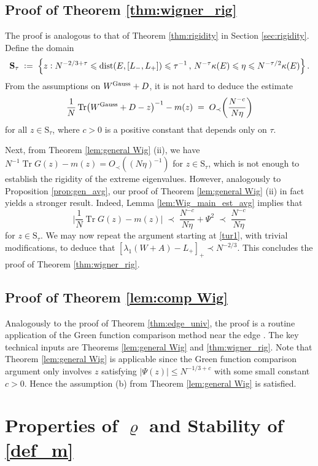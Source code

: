 \documentclass[11pt]{article} %
\numberwithin{equation}{section}
\numberwithin{figure}{section}
\theoremstyle{plain} %
\theoremstyle{definition} %
\newcommand{\f}[1]{\boldsymbol{\mathrm{#1}}} %
\newcommand{\txt}[1]{\text{\rm{#1}}}
\newcommand{\col}{\mathrel{\vcenter{\baselineskip0.75ex \lineskiplimit0pt \hbox{.}\hbox{.}}}}
\newcommand*{\deq}{\mathrel{\vcenter{\baselineskip0.65ex \lineskiplimit0pt \hbox{.}\hbox{.}}}=}
\renewcommand{\leq}{\leqslant}
\newcommand{\pb}[1]{\bigl({#1}\bigr)}
\newcommand{\pbb}[1]{\biggl({#1}\biggr)}
\newcommand{\hB}[1]{\Bigl\{{#1}\Bigr\}}
\newcommand{\abs}[1]{\lvert #1 \rvert}
\newcommand{\absbb}[1]{\biggl\lvert #1 \biggr\rvert}
\DeclareMathOperator{\tr}{Tr}
\DeclareMathOperator{\dist}{dist}
\begin{document}
\subsection{Proof of Theorem \ref{thm:wigner_rig}}
The proof is analogous to that of Theorem \ref{thm:rigidity} in Section \ref{sec:rigidity}. Define the domain
$$
\f S_\tau \;\deq\; \hB{ z\col N^{-2/3+\tau} \leq \dist(E, [L_-, L_+]) \leq \tau^{-1} \,,\, N^{-\tau} \kappa(E) \leq \eta \leq  N^{-\tau/2} \kappa(E)}\,.
$$
From the assumptions on $W^{\txt{Gauss}} + D$, it is not hard to deduce the estimate
$$
\frac{1}{N} \tr \pb{W^{\txt{Gauss}} + D - z}^{-1} - m(z) \;=\; O_\prec \pbb{\frac{N^{-c}}{N\eta}}
$$
for all $z \in \f S_\tau$, where $c > 0$ is a positive constant that depends only on $\tau$.

Next, from Theorem \ref{lem:general Wig} (ii), we have $N^{-1} \tr G (z)- m(z) = O_\prec((N\eta)^{-1})$ for $z\in\f S _\tau$, which is not enough to establish the rigidity of the extreme eigenvalues. However, analogously to Proposition \ref{prop:gen_avg}, our proof of Theorem \ref{lem:general Wig} (ii) in fact yields a stronger result. Indeed, Lemma \ref{lem:Wig_main_est_avg} implies that
$$
\absbb{\frac{1}{N} \tr G (z) - m(z)} \;\prec\;  \frac{N^{-c}}{N\eta} + \Psi^2 \;\prec\; \frac{N^{-c}}{N\eta}
$$
for $z\in\f S _\tau$. We may now repeat the argument starting at \eqref{tur1}, with trivial modifications, to deduce that $[\lambda_1 (W+A)-L_+]_+\prec N^{-2/3}$. This concludes the proof of Theorem \ref{thm:wigner_rig}.

 
\subsection {Proof of Theorem \ref{lem:comp Wig}}
Analogously to the proof of Theorem \ref{thm:edge_univ}, the proof is a routine application of the Green function comparison method near the edge \cite[Section 6]{EYY3}. The key technical inputs are Theorems \ref{lem:general Wig} and \ref{thm:wigner_rig}. Note that Theorem \ref{lem:general Wig} is applicable since the Green function comparison argument only involves $z$ satisfying $\abs{\Psi(z)} \leq N^{-1/3+c}$ with some small constant $c>0$. Hence the assumption (b) from Theorem \ref{lem:general Wig} is satisfied. 




\appendix

\section{Properties of $\varrho$ and Stability of \eqref{def_m}} \label{sec:varrho}
\end{document}
